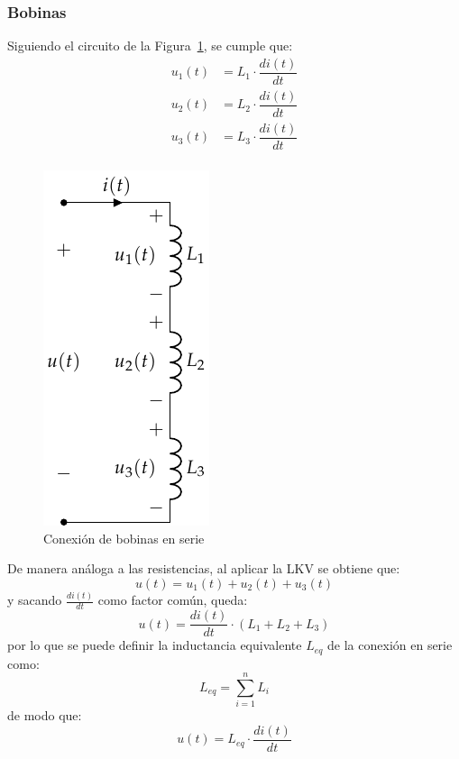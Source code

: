         \subsubsection{Bobinas}
        Siguiendo el circuito de la Figura~\ref{fig:bobinas-serie}, se
        cumple que:
        \begin{align*}
          u_1(t) &= L_1 \cdot \dfrac{di(t)}{dt}\\
          u_2(t) &= L_2 \cdot \dfrac{di(t)}{dt}\\
          u_3(t) &= L_3 \cdot \dfrac{di(t)}{dt}\\
        \end{align*}
        \begin{figure}[H]
          \centering
          \includegraphics[width=0.2\linewidth]{../figs/BobinasSerie.pdf}
          \caption{Conexión de bobinas en serie}
          \label{fig:bobinas-serie}
        \end{figure}
        De manera análoga a las resistencias, al aplicar la LKV se
        obtiene que:
        \begin{equation*}
          u(t) = u_1(t) + u_2(t) + u_3(t)
        \end{equation*}
        y sacando $\frac{di(t)}{dt}$ como factor común, queda:
        \begin{equation*}
          u(t) = \dfrac{di(t)}{dt} \cdot (L_1 + L_2 + L_3)
        \end{equation*}
        por lo que se puede definir la inductancia equivalente
        $L_{eq}$ de la conexión en serie como:
        \begin{equation}
          \boxed{L_{eq} = \sum_{i = 1}^n L_i}
        \end{equation}
        de modo que:
        \begin{equation*}
          u(t) = L_{eq} \cdot \dfrac{di(t)}{dt}
        \end{equation*}
